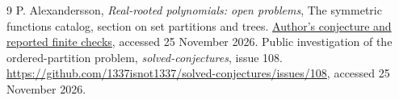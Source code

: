 \documentclass[11pt]{article}
\begin{document}
\begin{thebibliography}{9}
 P. Alexandersson, \emph{Real-rooted polynomials: open problems}, The symmetric functions catalog, section on set partitions and trees. \href{https://www.symmetricfunctions.com/realRootedOpenProblems.htm\#openProblemsSetPartitions}{Author's conjecture and reported finite checks}, accessed 25 November 2026.
 Public investigation of the ordered-partition problem, \emph{solved-conjectures}, issue 108. \url{https://github.com/1337isnot1337/solved-conjectures/issues/108}, accessed 25 November 2026.
\end{thebibliography}
\end{document}

